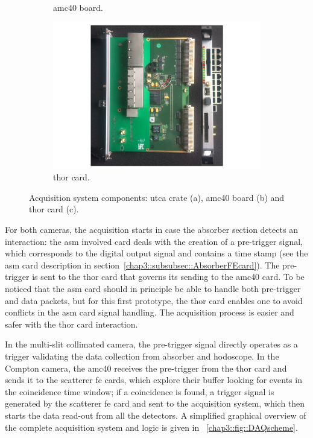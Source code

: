 \begin{figure}
\begin{subfigure}[htbp]{.41\textwidth}
\caption{\gls{amc}40 board.}
\label{chap3::fig::AMC40}
\end{subfigure}
\newline
\begin{subfigure}[b]{\textwidth}
\centering
\includegraphics[width=0.8\linewidth]{03_GraphicFiles/chapter3_CLaRySproto/Electronics_Acquisition/THOR.pdf}
\caption{\gls{thor} card.}
\label{chap3::fig::THOR}
\end{subfigure}
\caption{Acquisition system components: \gls{utca} crate (a), \gls{amc}40 board (b) and \gls{thor} card (c).}
\label{chap3::fig::AcquisitionSystem}
\end{figure}


For both cameras, the acquisition starts in case the absorber section detects an interaction: the \gls{asm} involved card deals with the creation of a pre-trigger signal, which corresponds to the digital output signal and contains a time stamp (see the \gls{asm} card description in section~\ref{chap3::subsubsec::AbsorberFEcard}). The pre-trigger is sent to the \gls{thor} card that governs its sending to the \gls{amc}40 card. To be noticed that the \gls{asm} card should in principle be able to handle both pre-trigger and data packets, but for this first prototype, the \gls{thor} card enables one to avoid conflicts in the \gls{asm} card signal handling. The acquisition process is easier and safer with the \gls{thor} card interaction. 
 
In the multi-slit collimated camera, the pre-trigger signal directly operates as a trigger validating the data collection from absorber and hodoscope. In the Compton camera, the \gls{amc}40 receives the pre-trigger from the \gls{thor} card and sends it to the scatterer \gls{fe} cards, which explore their buffer looking for events in the coincidence time window; if a coincidence is found, a trigger signal is generated by the scatterer \gls{fe} card and sent to the acquisition system, which then starts the data read-out from all the detectors. A simplified graphical overview of the complete acquisition system and logic is given in \figurename~\ref{chap3::fig::DAQscheme}.

